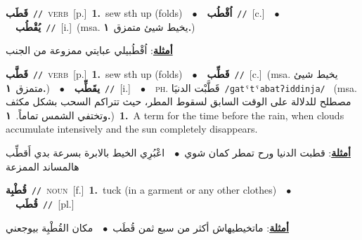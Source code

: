 \documentclass[10pt,a4paper,twoside]{article} %
\begin{document}
\begin{multicols}{2}
{\setlength\topsep{0pt}\textbf{\foreignlanguage{arabic}{قَطَب}}\ {\color{gray}\texttt{//}\color{black}}\ \textsc{verb}\ [p.]\ \textbf{1.}~sew sth up (folds)\ \ $\bullet$\ \ \setlength\topsep{0pt}\textbf{\foreignlanguage{arabic}{اُقْطُب}}\ {\color{gray}\texttt{//}\color{black}}\ [c.]\ \ $\bullet$\ \ \setlength\topsep{0pt}\textbf{\foreignlanguage{arabic}{يُقْطُب}}\ {\color{gray}\texttt{//}\color{black}}\ [i.]\ \color{gray}(msa. \foreignlanguage{arabic}{يخيط شيئ متمزق}~\foreignlanguage{arabic}{\textbf{١.}})\color{black}\  \begin{flushright}\color{gray}\foreignlanguage{arabic}{\textbf{\underline{\foreignlanguage{arabic}{أمثلة}}}: اُقْطُبيلي عبايتي ممزوعة من الجنب}\end{flushright}\color{black}} \vspace{2mm}

{\setlength\topsep{0pt}\textbf{\foreignlanguage{arabic}{قَطَّب}}\ {\color{gray}\texttt{//}\color{black}}\ \textsc{verb}\ [p.]\ \textbf{1.}~sew sth up (folds)\ \ $\bullet$\ \ \setlength\topsep{0pt}\textbf{\foreignlanguage{arabic}{قَطِّب}}\ {\color{gray}\texttt{//}\color{black}}\ [c.]\ \color{gray}(msa. \foreignlanguage{arabic}{يخيط شيئ متمزق}~\foreignlanguage{arabic}{\textbf{١.}})\color{black}\ \ $\bullet$\ \ \setlength\topsep{0pt}\textbf{\foreignlanguage{arabic}{يقَطِّب}}\ {\color{gray}\texttt{//}\color{black}}\ [i.]\ \ $\bullet$\ \ \textsc{ph.} \color{gray} \foreignlanguage{arabic}{قَطَّبْت الدنيَا}\color{black}\ {\color{gray}\texttt{/{\sffamily ɡatˤtˤabatʔiddinja}/}\color{black}}\ \color{gray} (msa. \foreignlanguage{arabic}{مصطلح للدلالة على الوقت السابق لسقوط المطر، حيث تتراكم السحب بشكل مكثف وتختفي الشمس تماماً.}~\foreignlanguage{arabic}{\textbf{١.}})\color{black}\ \textbf{1.}~A term for the time before the rain, when clouds accumulate intensively and the sun completely disappears.\  \begin{flushright}\color{gray}\foreignlanguage{arabic}{\textbf{\underline{\foreignlanguage{arabic}{أمثلة}}}: قطبت الدنيا ورح تمطر كمان شوي\ $\bullet$\ \  اعْبُرِي الخيط بالابرة بسرعة بدي أَقطِّب هالمساند الممزعة}\end{flushright}\color{black}} \vspace{2mm}

{\setlength\topsep{0pt}\textbf{\foreignlanguage{arabic}{قُطْبِة}}\ {\color{gray}\texttt{//}\color{black}}\ \textsc{noun}\ [f.]\ \textbf{1.}~tuck (in a garment or any other clothes)\ \ $\bullet$\ \ \setlength\topsep{0pt}\textbf{\foreignlanguage{arabic}{قُطَب}}\ {\color{gray}\texttt{//}\color{black}}\ [pl.]\  \begin{flushright}\color{gray}\foreignlanguage{arabic}{\textbf{\underline{\foreignlanguage{arabic}{أمثلة}}}: ماتخيطيهاش أكثر من سبع ثمن قُطَب\ $\bullet$\ \  مكان القُطْبِة بيوجعني}\end{flushright}\color{black}} \vspace{2mm}


\end{multicols}
\end{document}
